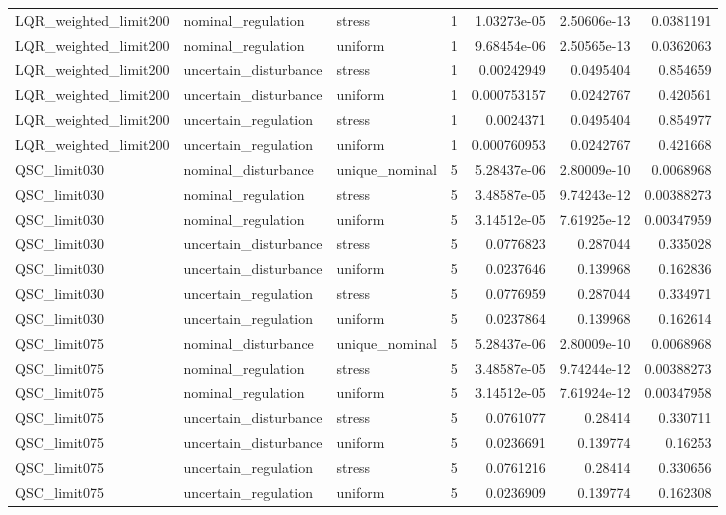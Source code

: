 \begin{tabular}{llllrrr}
LQR\_weighted\_limit200 & nominal\_regulation & stress & 1 & 1.03273e-05 & 2.50606e-13 & 0.0381191 \\
LQR\_weighted\_limit200 & nominal\_regulation & uniform & 1 & 9.68454e-06 & 2.50565e-13 & 0.0362063 \\
LQR\_weighted\_limit200 & uncertain\_disturbance & stress & 1 & 0.00242949 & 0.0495404 & 0.854659 \\
LQR\_weighted\_limit200 & uncertain\_disturbance & uniform & 1 & 0.000753157 & 0.0242767 & 0.420561 \\
LQR\_weighted\_limit200 & uncertain\_regulation & stress & 1 & 0.0024371 & 0.0495404 & 0.854977 \\
LQR\_weighted\_limit200 & uncertain\_regulation & uniform & 1 & 0.000760953 & 0.0242767 & 0.421668 \\
QSC\_limit030 & nominal\_disturbance & unique\_nominal & 5 & 5.28437e-06 & 2.80009e-10 & 0.0068968 \\
QSC\_limit030 & nominal\_regulation & stress & 5 & 3.48587e-05 & 9.74243e-12 & 0.00388273 \\
QSC\_limit030 & nominal\_regulation & uniform & 5 & 3.14512e-05 & 7.61925e-12 & 0.00347959 \\
QSC\_limit030 & uncertain\_disturbance & stress & 5 & 0.0776823 & 0.287044 & 0.335028 \\
QSC\_limit030 & uncertain\_disturbance & uniform & 5 & 0.0237646 & 0.139968 & 0.162836 \\
QSC\_limit030 & uncertain\_regulation & stress & 5 & 0.0776959 & 0.287044 & 0.334971 \\
QSC\_limit030 & uncertain\_regulation & uniform & 5 & 0.0237864 & 0.139968 & 0.162614 \\
QSC\_limit075 & nominal\_disturbance & unique\_nominal & 5 & 5.28437e-06 & 2.80009e-10 & 0.0068968 \\
QSC\_limit075 & nominal\_regulation & stress & 5 & 3.48587e-05 & 9.74244e-12 & 0.00388273 \\
QSC\_limit075 & nominal\_regulation & uniform & 5 & 3.14512e-05 & 7.61924e-12 & 0.00347958 \\
QSC\_limit075 & uncertain\_disturbance & stress & 5 & 0.0761077 & 0.28414 & 0.330711 \\
QSC\_limit075 & uncertain\_disturbance & uniform & 5 & 0.0236691 & 0.139774 & 0.16253 \\
QSC\_limit075 & uncertain\_regulation & stress & 5 & 0.0761216 & 0.28414 & 0.330656 \\
QSC\_limit075 & uncertain\_regulation & uniform & 5 & 0.0236909 & 0.139774 & 0.162308 \\

\end{tabular}
